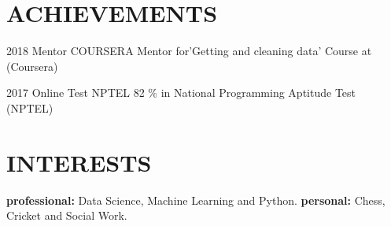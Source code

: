 \documentclass[]{cv-style}          %
\begin{document}

\section{ACHIEVEMENTS}

\begin{entrylist}
\entry
{2018}
{Mentor}
{COURSERA}
{Mentor for’Getting and cleaning data’ Course at (Coursera)}
\end{entrylist}
\begin{entrylist}
%
\entry
{2017}
{Online Test}
{NPTEL}
{82 \% in National Programming Aptitude Test (NPTEL)}

\end{entrylist}



\section{INTERESTS}
  \vspace{-0.2cm}

\textbf{professional:} Data Science, Machine Learning and Python.\newline
\textbf{personal:} Chess, Cricket and Social Work.

\end{document}

